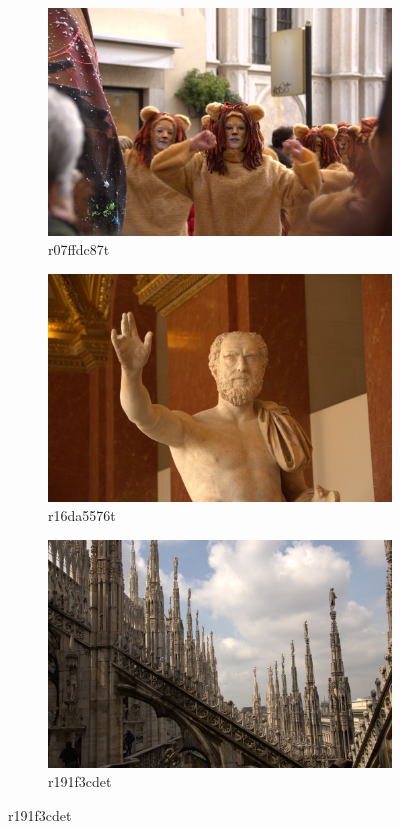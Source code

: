 \documentclass{ipol}
\begin{document}
\begin{figure}[ht]
    \begin{subfigure}[c]{.31\linewidth}\centering
    \includegraphics[width=\linewidth]{images/original/r07ffdc87t.jpeg}
    \caption{r07ffdc87t}
    \end{subfigure}\hfill%
    \begin{subfigure}[c]{.31\linewidth}\centering
    \includegraphics[width=\linewidth]{images/original/r16da5576t.jpeg}
    \caption{r16da5576t}
    \end{subfigure}\hfill%
    \begin{subfigure}[c]{.31\linewidth}\centering
    \includegraphics[width=\linewidth]{images/original/r191f3cdet.jpeg}
    \caption{r191f3cdet}
    \end{subfigure}
    

\end{figure}
\end{document}
